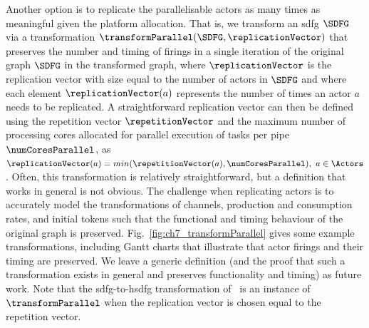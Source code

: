Another option is to replicate the parallelisable actors as many times as meaningful given the platform allocation. That is, we transform an \gls{sdfg} $\SDFG$ via a transformation
$\transformParallel(\SDFG,\replicationVector)$ that preserves the number and timing of firings in a single iteration of the original graph $\SDFG$ in the transformed graph, where $\replicationVector$ is the replication vector with size equal to the number of actors in $\SDFG$ and where each element $\replicationVector(a)$ represents the number of times an actor $a$ needs to be replicated.
A straightforward replication vector can then be defined using the repetition vector $\repetitionVector$ and the maximum number of processing cores allocated for parallel execution of tasks per pipe $\numCoresParallel$, as $\replicationVector(a)=min(\repetitionVector(a),\numCoresParallel),\ a\in \Actors$. Often, this transformation is relatively straightforward, but a definition that works in general is not obvious. The challenge when replicating actors is to accurately model the transformations of channels, production and consumption rates, and initial tokens such that the functional and timing behaviour of the original graph is preserved.
Fig.~\ref{fig:ch7_transformParallel} gives some example transformations, including Gantt charts that illustrate that actor firings and their timing are preserved. We leave a generic definition (and the proof that such a transformation exists in general and preserves functionality and timing) as future work. Note that the \gls{sdfg}-to-\gls{hsdfg} transformation of~\cite{lee1987synchronous,sriram2018embedded} is an instance of $\transformParallel$ when the replication vector is chosen equal to the repetition vector.

